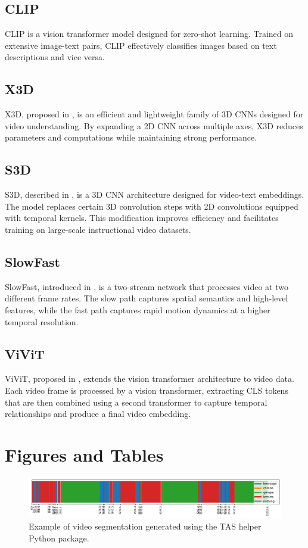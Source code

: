 \subsection*{CLIP}
CLIP is a vision transformer model designed for zero-shot learning. Trained on extensive image-text pairs, CLIP effectively classifies images based on text descriptions and vice versa.

\subsection*{X3D}
X3D, proposed in \cite{x3d}, is an efficient and lightweight family of 3D CNNs designed for video understanding. By expanding a 2D CNN across multiple axes, X3D reduces parameters and computations while maintaining strong performance.

\subsection*{S3D}
S3D, described in \cite{s3d}, is a 3D CNN architecture designed for video-text embeddings. The model replaces certain 3D convolution steps with 2D convolutions equipped with temporal kernels. This modification improves efficiency and facilitates training on large-scale instructional video datasets.

\subsection*{SlowFast}
SlowFast, introduced in \cite{slowfast}, is a two-stream network that processes video at two different frame rates. The slow path captures spatial semantics and high-level features, while the fast path captures rapid motion dynamics at a higher temporal resolution.

\subsection*{ViViT}
ViViT, proposed in \cite{vivit}, extends the vision transformer architecture to video data. Each video frame is processed by a vision transformer, extracting CLS tokens that are then combined using a second transformer to capture temporal relationships and produce a final video embedding.

\section{Figures and Tables}



\begin{figure}[!h]
    \centering
    \includegraphics[width=1\linewidth]{../../assets/figures/real-example-of-segmentation.png}
    \caption{Example of video segmentation generated using the TAS helper Python package.}
    \label{fig:your-label}
\end{figure}